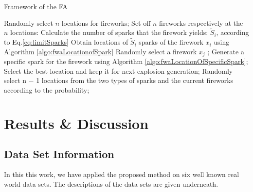 \documentclass[11pt, a4paper]{report}
\begin{document}
	\begin{algorithm}
	\caption{ Framework of the FA}
	\label{algo:fwaFramework}
	\begin{algorithmic}[0]
		\State Randomly select $ n $ locations for fireworks;
		\State Set off $ n $ fireworks respectively at the $ n $ locations:
		\State Calculate the number of sparks that the firework yields: $ \tilde{S}_{i} $, according to Eq.\ref{eq:limitSparks}
		\State Obtain locations of $ \tilde{S}_{i} $ sparks of the firework $ x_{i} $ using Algorithm \ref{algo:fwaLocationofSpark}
		\EndFor
		\State Randomly select a firework $ x_{j} $ ;
		\State Generate a specific spark for the firework using Algorithm \ref{algo:fwaLocationOfSpecificSpark};
		\EndFor
		\State Select the best location and keep it for next explosion generation;
		\State Randomly select n − 1 locations from the two types of sparks and the current
			fireworks according to the probability;
		\EndWhile
	\end{algorithmic}
\end{algorithm}
	
\newpage


%
%
%
%

\newpage

\chapter{Results \& Discussion}

\section{Data Set Information}
In this this work, we have applied the proposed method on six well known real world data sets. The descriptions of the data sets are given underneath.
\end{document}
